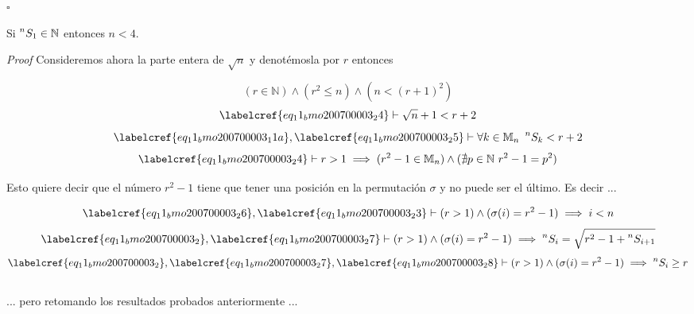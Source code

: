 \hfill $\square$

\begin{claim}
	Si $\prescript{n}{}{S_1} \in \mathbb{N}$ entonces $n<4$.
\end{claim}

\textit{Proof} Consideremos ahora la parte entera de $\sqrt{n}$ y denotémosla por $r$ entonces

\begin{equation} \label{eq_11_bmo200700003_24}
	(r \in \mathbb{N}) \land (r^2 \leq n) \land (n < (r+1)^2)
\end{equation}
\begin{equation} \label{eq_11_bmo200700003_25}
	\labelcref{eq_11_bmo200700003_24} \vdash \sqrt{n} + 1 < r+2
\end{equation}
\begin{equation} \label{eq_11_bmo200700003_25a}
	\labelcref{eq_11_bmo200700003_11a}, \labelcref{eq_11_bmo200700003_25} \vdash \forall k \in \mathbb{M}_n\ \prescript{n}{}{S_k} < r+2
\end{equation}
\begin{equation} \label{eq_11_bmo200700003_26}
	\labelcref{eq_11_bmo200700003_24} \vdash r>1 \implies (r^2 - 1 \in \mathbb{M}_n) \land (\nexists p \in \mathbb{N}\ r^2 - 1 = p^2)
\end{equation}

Esto quiere decir que el número $r^2 - 1$ tiene que tener una posición en la permutación $\sigma$ y no puede ser el último. Es decir ...

\begin{equation} \label{eq_11_bmo200700003_27}
	\labelcref{eq_11_bmo200700003_26}, \labelcref{eq_11_bmo200700003_23} \vdash (r>1) \land (\sigma(i) = r^2-1) \implies i<n
\end{equation}
\begin{equation} \label{eq_11_bmo200700003_28}
	\labelcref{eq_11_bmo200700003_2}, \labelcref{eq_11_bmo200700003_27} \vdash (r>1) \land (\sigma(i) = r^2-1) \implies \prescript{n}{}{S_i} = \sqrt{r^2 - 1 + \prescript{n}{}{S_{i+1}}}
\end{equation}
\begin{equation} \label{eq_11_bmo200700003_29}
	\labelcref{eq_11_bmo200700003_2}, \labelcref{eq_11_bmo200700003_27}, \labelcref{eq_11_bmo200700003_28} \vdash (r>1) \land (\sigma(i) = r^2-1) \implies \prescript{n}{}{S_i} \geq r
\end{equation}
\\
... pero retomando los resultados probados anteriormente ...

